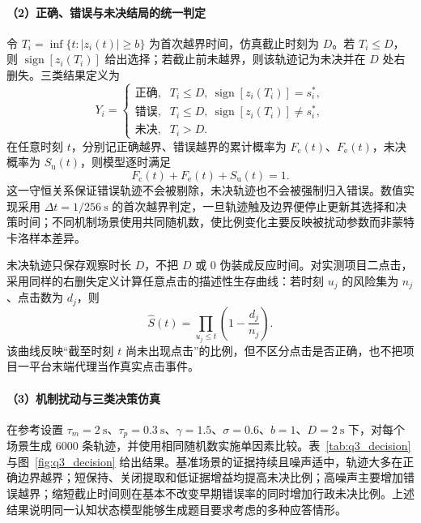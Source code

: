 \documentclass[a4paper]{ctexart}
\numberwithin{figure}{section}       %
\begin{document}
\paragraph{（2）正确、错误与未决结局的统一判定}

令 $T_i=\inf\{t:|z_i(t)|\ge b\}$ 为首次越界时间，仿真截止时刻为 $D$。若 $T_i\le D$，则 $\operatorname{sign}[z_i(T_i)]$ 给出选择；若截止前未越界，则该轨迹记为未决并在 $D$ 处右删失。三类结果定义为
\begin{equation}
Y_i=
\begin{cases}
\text{正确}, & T_i\le D,\ \operatorname{sign}[z_i(T_i)]=s_i^*,\\
\text{错误}, & T_i\le D,\ \operatorname{sign}[z_i(T_i)]\ne s_i^*,\\
\text{未决}, & T_i>D.
\end{cases}
\tag{3-10}
\label{eq:q3_outcome}
\end{equation}
在任意时刻 $t$，分别记正确越界、错误越界的累计概率为 $F_{\mathrm c}(t)$、$F_{\mathrm e}(t)$，未决概率为 $S_{\mathrm u}(t)$，则模型逐时满足
\[
F_{\mathrm c}(t)+F_{\mathrm e}(t)+S_{\mathrm u}(t)=1.
\]
这一守恒关系保证错误轨迹不会被剔除，未决轨迹也不会被强制归入错误。数值实现采用 $\Delta t=1/256~\mathrm{s}$ 的首次越界判定，一旦轨迹触及边界便停止更新其选择和决策时间；不同机制场景使用共同随机数，使比例变化主要反映被扰动参数而非蒙特卡洛样本差异。

未决轨迹只保存观察时长 $D$，不把 $D$ 或 0 伪装成反应时间。对实测项目二点击，采用同样的右删失定义计算任意点击的描述性生存曲线：若时刻 $u_j$ 的风险集为 $n_j$、点击数为 $d_j$，则
\begin{equation}
\widehat S(t)=\prod_{u_j\le t}\left(1-\frac{d_j}{n_j}\right).
\tag{3-11}
\label{eq:q3_survival}
\end{equation}
该曲线反映“截至时刻 $t$ 尚未出现点击”的比例，但不区分点击是否正确，也不把项目一平台末端代理当作真实点击事件。

\paragraph{（3）机制扰动与三类决策仿真}

在参考设置 $\tau_m=2~\mathrm{s}$、$\tau_p=0.3~\mathrm{s}$、$\gamma=1.5$、$\sigma=0.6$、$b=1$、$D=2~\mathrm{s}$ 下，对每个场景生成 6000 条轨迹，并使用相同随机数实施单因素比较。表~\ref{tab:q3_decision} 与图~\ref{fig:q3_decision} 给出结果。基准场景的证据持续且噪声适中，轨迹大多在正确边界越界；短保持、关闭提取和低证据增益均提高未决比例；高噪声主要增加错误越界；缩短截止时间则在基本不改变早期错误率的同时增加行政未决比例。上述结果说明同一认知状态模型能够生成题目要求考虑的多种应答情形。
\end{document}
